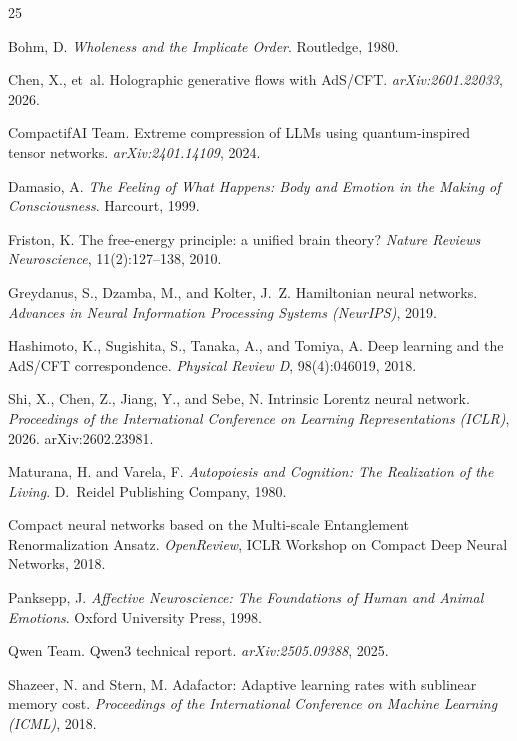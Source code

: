 \documentclass[11pt,a4paper,twocolumn]{article}
\begin{document}
\begin{thebibliography}{25}

Bohm, D.
\emph{Wholeness and the Implicate Order}.
Routledge, 1980.

Chen, X., et~al.
Holographic generative flows with AdS/CFT.
\emph{arXiv:2601.22033}, 2026.

CompactifAI Team.
Extreme compression of LLMs using quantum-inspired tensor networks.
\emph{arXiv:2401.14109}, 2024.

Damasio, A.
\emph{The Feeling of What Happens: Body and Emotion in the Making of Consciousness}.
Harcourt, 1999.

Friston, K.
The free-energy principle: a unified brain theory?
\emph{Nature Reviews Neuroscience}, 11(2):127--138, 2010.

Greydanus, S., Dzamba, M., and Kolter, J.~Z.
Hamiltonian neural networks.
\emph{Advances in Neural Information Processing Systems (NeurIPS)}, 2019.

Hashimoto, K., Sugishita, S., Tanaka, A., and Tomiya, A.
Deep learning and the AdS/CFT correspondence.
\emph{Physical Review D}, 98(4):046019, 2018.

Shi, X., Chen, Z., Jiang, Y., and Sebe, N.
Intrinsic Lorentz neural network.
\emph{Proceedings of the International Conference on Learning Representations (ICLR)}, 2026.
arXiv:2602.23981.

Maturana, H. and Varela, F.
\emph{Autopoiesis and Cognition: The Realization of the Living}.
D.\ Reidel Publishing Company, 1980.

Compact neural networks based on the Multi-scale Entanglement Renormalization Ansatz.
\emph{OpenReview}, ICLR Workshop on Compact Deep Neural Networks, 2018.

Panksepp, J.
\emph{Affective Neuroscience: The Foundations of Human and Animal Emotions}.
Oxford University Press, 1998.

Qwen Team.
Qwen3 technical report.
\emph{arXiv:2505.09388}, 2025.

Shazeer, N. and Stern, M.
Adafactor: Adaptive learning rates with sublinear memory cost.
\emph{Proceedings of the International Conference on Machine Learning (ICML)}, 2018.


\end{thebibliography}
\end{document}
